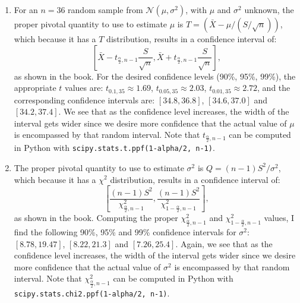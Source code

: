 \begin{problem}{14}$ $
\begin{enumerate}

\item For an $n=36$ random sample from $\mathcal N(\mu, \sigma^2)$, with $\mu$ and $\sigma^2$ unknown, the proper pivotal quantity to use to estimate $\mu$ is $T=(\bar X-\mu/(S/\sqrt{n}))$, which because it has a $T$ distribution, results in a confidence interval of:
\begin{equation*}
\left [\bar X -t_{\frac{\alpha}{2}, n-1}\frac{S}{\sqrt{n}}, \bar X +t_{\frac{\alpha}{2}, n-1}\frac{S}{\sqrt{n}} \right],
\end{equation*}
as shown in the book.  For the desired confidence levels (90\%, 95\%, 99\%), the appropriate $t$ values are: $t_{0.1, 35} \approx 1.69$, $t_{0.05, 35} \approx 2.03$, $t_{0.01, 35} \approx 2.72$, and the corresponding confidence intervals are: $[34.8, 36.8]$, $[34.6, 37.0]$ and $[34.2, 37.4]$.  We see that as the confidence level increases, the width of the interval gets wider since we desire more confidence that the actual value of $\mu$ is encompassed by that random interval.  Note that $t_{\frac{\alpha}{2}, n-1}$ can be computed in Python with \texttt{scipy.stats.t.ppf(1-alpha/2, n-1)}.


\item  The proper pivotal quantity to use to estimate $\sigma^2$ is $Q=(n-1)S^2/\sigma^2$, which because it has a $\chi^2$ distribution, results in a confidence interval of:
\begin{equation*}
\left [\frac{(n-1)S^2}{\chi^2_{\frac{\alpha}{2}, n-1}}, \frac{(n-1)S^2}{\chi^2_{1-\frac{\alpha}{2}, n-1}} \right],
\end{equation*}
as shown in the book.  Computing the proper $\chi^2_{\frac{\alpha}{2}, n-1}$ and $\chi^2_{1-\frac{\alpha}{2}, n-1}$ values, I find the following 90\%, 95\% and 99\% confidence intervals for $\sigma^2$: $[8.78, 19.47]$, $[8.22, 21.3]$ and $[7.26, 25.4]$.  Again, we see that as the confidence level increases, the width of the interval gets wider since we desire more confidence that the actual value of $\sigma^2$ is encompassed by that random interval. Note that $\chi^2_{\frac{\alpha}{2}, n-1}$ can be computed in Python with \texttt{scipy.stats.chi2.ppf(1-alpha/2, n-1)}.

\end{enumerate}

\end{problem}

